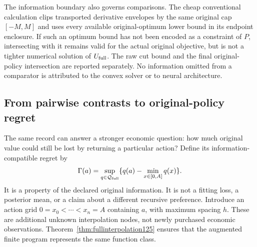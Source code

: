 The information boundary also governs comparisons. The cheap conventional
calculation clips transported derivative envelopes by the same original
cap $[-M,M]$ and uses every available original-optimum lower bound
in its endpoint enclosure. If such an optimum bound has not been encoded
as a constraint of $P$, intersecting with it remains valid for the
actual original objective, but is not a tighter numerical solution of
$U_{\rm full}$. The raw cut bound and the final original-policy
intersection are reported separately. No information omitted from a
comparator is attributed to the convex solver or to neural architecture.

\subsection{From pairwise contrasts to original-policy regret}

The same record can answer a stronger economic question: how much
original value could still be lost by returning a particular action?
Define its information-compatible regret by
\begin{equation}\label{eq:inforegret126}
 \Gamma(a)=\sup_{q\in\mathcal Q_{\rm full}}
               \{q(a)-\min_{x\in[0,A]}q(x)\}.
\end{equation}
It is a property of the declared original information. It is not a
fitting loss, a posterior mean, or a claim about a different recursive
preference. Introduce an action grid
$0=x_0<\cdots<x_n=A$ containing $a$, with maximum spacing $h$.
These are additional unknown interpolation nodes, not newly purchased
economic observations. Theorem~\ref{thm:fullinterpolation125} ensures
that the augmented finite program represents the same function class.


